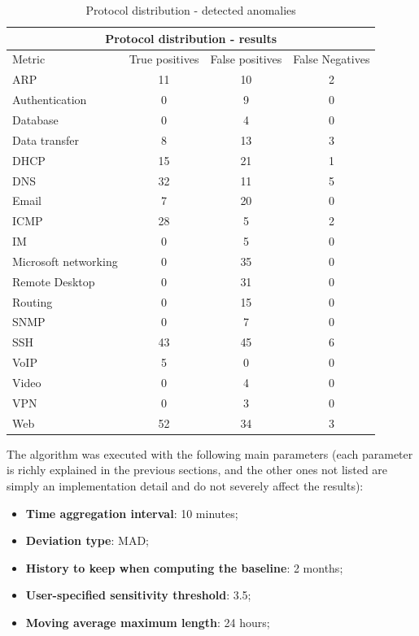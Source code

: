\documentclass[12pt,a4paper,cucitura]{toptesi}
\begin{document}
\begin{center}
\begin{table}
\centering
\begin{tabular}{l|c|c|c}
\hline
\hline
\multicolumn{4}{c}{Protocol distribution - results} \\
\hline
Metric & True positives & False positives & False Negatives \\
\hline
ARP & 11 & 10 & 2 \\
Authentication & 0 & 9 & 0 \\
Database & 0 & 4 & 0 \\
Data transfer & 8 & 13 & 3 \\
DHCP & 15 & 21 & 1 \\
DNS & 32 & 11 & 5 \\
Email & 7 & 20 & 0 \\
ICMP & 28 & 5 & 2 \\
IM & 0 & 5 & 0 \\
Microsoft networking & 0 & 35 & 0\\
Remote Desktop & 0 & 31 & 0 \\
Routing & 0 & 15& 0 \\
SNMP & 0 & 7 & 0 \\
SSH & 43 & 45 & 6 \\
VoIP & 5 & 0 & 0 \\
Video & 0 & 4 & 0 \\
VPN & 0 & 3 & 0 \\
Web & 52 & 34 & 3 \\
\hline
\hline
\end{tabular}
\caption{Protocol distribution - detected anomalies}
\end{table}
\end{center}

The algorithm was executed with the following main parameters (each parameter is richly explained in the previous sections, and the other ones not listed are simply an implementation detail and do not severely affect the results):

\begin{itemize}
\item \textbf{Time aggregation interval}: 10 minutes;
\item \textbf{Deviation type}: MAD;
\item \textbf{History to keep when computing the baseline}: 2 months;
\item \textbf{User-specified sensitivity threshold}: 3.5;
\item \textbf{Moving average maximum length}: 24 hours;
\end{itemize}
\end{document}

